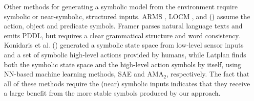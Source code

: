 
Other methods for generating a symbolic model from the environment
require symbolic or near-symbolic, structured inputs. ARMS \cite{YangWJ07}, LOCM
\cite{CresswellMW13}, and \citeauthor{MouraoZPS12} (\citeyear{MouraoZPS12})
assume the action, object and predicate symbols.
% 
Framer \cite{lindsay2017framer} parses natural language texts and emits PDDL,
but requires a clear grammatical structure and word consistency. %
% 
Konidaris et al. (\citeyear{KonidarisKL18}) generated a symbolic state space from
low-level sensor inputs and a set of symbolic high-level actions provided by humans,
% 
while Latplan finds both the symbolic state space 
and the high-level action symbols by itself, using NN-based machine learning methods,
SAE and AMA$_2$, respectively.
% 
The fact that all of these methods require the (near) symbolic inputs indicates
that they receive a large benefit from the more stable symbols
produced by our approach.

% 


